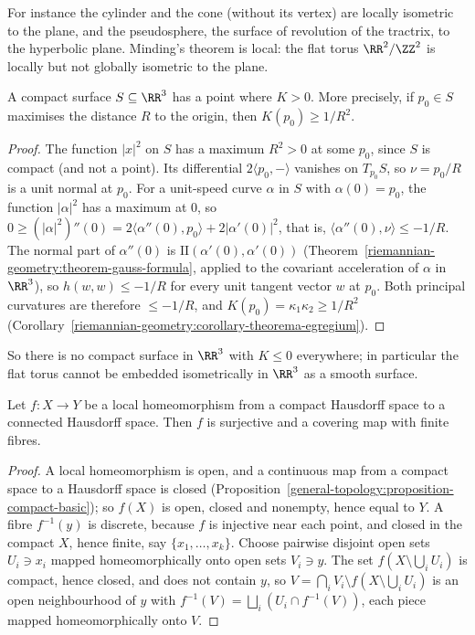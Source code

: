 For instance the cylinder and the cone (without its vertex) are locally isometric to the plane, and the pseudosphere, the surface of revolution of the tractrix, to the hyperbolic
plane. Minding's theorem is local: the flat torus $\RR^2/\ZZ^2$ is locally but not globally isometric to the plane.

\begin{lemma}\label{riemannian-geometry:lemma-elliptic-point}
A compact surface $S \subseteq \RR^3$ has a point where $K > 0$. More precisely, if $p_0 \in S$ maximises the distance $R$ to the origin, then $K(p_0) \geq 1/R^2$.
\end{lemma}

\begin{proof}
The function $|x|^2$ on $S$ has a maximum $R^2 > 0$ at some $p_0$, since $S$ is compact (and not a point). Its differential $2\langle p_0, -\rangle$ vanishes on $T_{p_0}S$, so
$\nu = p_0/R$ is a unit normal at $p_0$. For a unit-speed curve $\alpha$ in $S$ with $\alpha(0) = p_0$, the function $|\alpha|^2$ has a maximum at $0$, so
$0 \geq (|\alpha|^2)''(0) = 2\langle\alpha''(0), p_0\rangle + 2|\alpha'(0)|^2$, that is, $\langle\alpha''(0), \nu\rangle \leq -1/R$. The normal part of $\alpha''(0)$ is
$\mathrm{II}(\alpha'(0), \alpha'(0))$ (Theorem~\ref{riemannian-geometry:theorem-gauss-formula}, applied to the covariant acceleration of $\alpha$ in $\RR^3$), so
$h(w, w) \leq -1/R$ for every unit tangent vector $w$ at $p_0$. Both principal curvatures are therefore $\leq -1/R$, and $K(p_0) = \kappa_1\kappa_2 \geq 1/R^2$
(Corollary~\ref{riemannian-geometry:corollary-theorema-egregium}).
\end{proof}

So there is no compact surface in $\RR^3$ with $K \leq 0$ everywhere; in particular the flat torus cannot be embedded isometrically in $\RR^3$ as a smooth surface.

\begin{lemma}\label{riemannian-geometry:lemma-proper-covering}
Let $f \colon X \to Y$ be a local homeomorphism from a compact Hausdorff space to a connected Hausdorff space. Then $f$ is surjective and a covering map with finite fibres.
\end{lemma}

\begin{proof}
A local homeomorphism is open, and a continuous map from a compact space to a Hausdorff space is closed (Proposition~\ref{general-topology:proposition-compact-basic}); so $f(X)$ is
open, closed and nonempty, hence equal to $Y$. A fibre $f^{-1}(y)$ is discrete, because $f$ is injective near each point, and closed in the compact $X$, hence finite, say
$\{x_1, \ldots, x_k\}$. Choose pairwise disjoint open sets $U_i \ni x_i$ mapped homeomorphically onto open sets $V_i \ni y$. The set $f(X \setminus \bigcup_iU_i)$ is compact, hence
closed, and does not contain $y$, so $V = \bigcap_iV_i \setminus f(X \setminus \bigcup_iU_i)$ is an open neighbourhood of $y$ with $f^{-1}(V) = \bigsqcup_i(U_i \cap f^{-1}(V))$, each piece
mapped homeomorphically onto $V$.
\end{proof}

